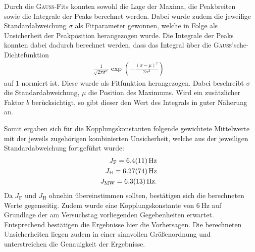 Durch die \textsc{Gauss}-Fits konnten sowohl die Lage der Maxima, die Peakbreiten sowie die Integrale der Peaks berechnet werden.
Dabei wurde zudem die jeweilige Standardabweichung $\sigma$ als Fitparameter gewonnen, welche in Folge als Unsicherheit der Peakposition herangezogen wurde.
Die Integrale der Peaks konnten dabei dadurch berechnet werden, dass das Integral über die \textsc{Gauss}'sche-Dichtefunktion
\begin{align}
    \frac{1}{\sqrt{2 \pi \sigma^2}} \exp{\left(-\frac{\left(x-\mu\right)^2}{2 \sigma^2}\right)}
\end{align}
auf $1$ normiert ist.
Diese wurde als Fitfunktion herangezogen.
Dabei beschreibt $\sigma$ die Standardabweichung, $\mu$ die Position des Maximums. Wird ein zusätzlicher Faktor $b$ berücksichtigt, so gibt dieser den Wert des Integrals in guter Näherung an.

Somit ergaben sich für die Kopplungskonstanten folgende gewichtete Mittelwerte mit der jeweils zugehörigen kombinierten Unsicherheit, welche aus der jeweiligen Standardabweichung fortgeführt wurde:
\begin{align*}
    J_{\text{F}} = \SI{6.4 \pm 1.1}{\hertz} \\
    J_{\text{H}} = \SI{6.27 \pm 0.74}{\hertz} \\
    J_{\text{MW}} = \SI{6.3 \pm 1.3}{\hertz}.
\end{align*}
Da $J_{\text{F}}$ und $J_{\text{H}}$ ohnehin übereinstimmen sollten, bestätigen sich die berechneten Werte gegenseitig.
Zudem wurde eine Kopplungskonstante von $\SI{6}{\hertz}$ auf Grundlage der am Versuchstag vorliegenden Gegebenheiten erwartet.
Entsprechend bestätigen die Ergebnisse hier die Vorhersagen.
Die berechneten Unsicherheiten liegen zudem in einer sinnvollen Größenordnung und unterstreichen die Genauigkeit der Ergebnisse.

